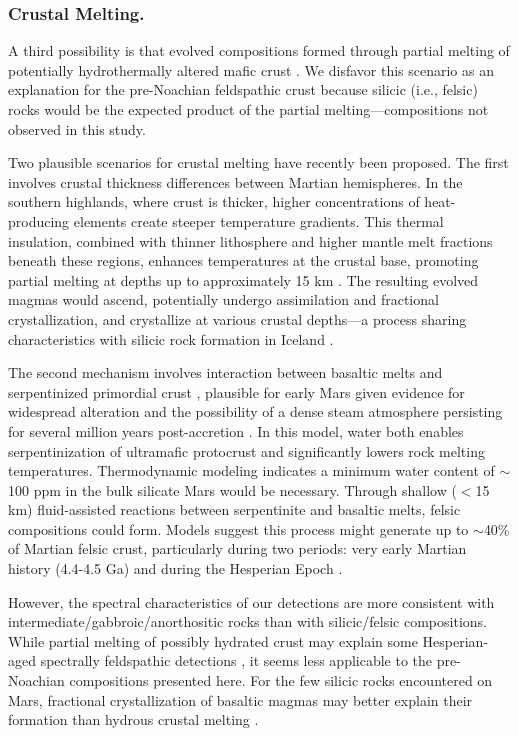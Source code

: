 \documentclass[11pt]{article}
\begin{document}
\subsubsection*{Crustal Melting.} 

A third possibility is that evolved compositions formed through partial melting of potentially hydrothermally altered mafic crust \citep{BonnetGibet2025, Bernadet2025}. We disfavor this scenario as an explanation for the pre-Noachian feldspathic crust because silicic (i.e., felsic) rocks would be the expected product of the partial melting---compositions not observed in this study.

Two plausible scenarios for crustal melting have recently been proposed. The first involves crustal thickness differences between Martian hemispheres. In the southern highlands, where crust is thicker, higher concentrations of heat-producing elements create steeper temperature gradients. This thermal insulation, combined with thinner lithosphere and higher mantle melt fractions beneath these regions, enhances temperatures at the crustal base, promoting partial melting at depths up to approximately 15 km \citep{BonnetGibet2022, BonnetGibet2025}. The resulting evolved magmas would ascend, potentially undergo assimilation and fractional crystallization, and crystallize at various crustal depths---a process sharing characteristics with silicic rock formation in Iceland \citep{Jonasson2007, Martin2007, Martin2010}.

The second mechanism involves interaction between basaltic melts and serpentinized primordial crust \citep{Bernadet2025}, plausible for early Mars given evidence for widespread alteration \citep{Bibring2006, Bishop2008, Ehlmann2009, Ehlmann2014, Wordsworth2017, Viviano2023, Carter2023, Royer2024} and the possibility of a dense steam atmosphere persisting for several million years post-accretion \citep{Abe2011, Scherf2020}. In this model, water both enables serpentinization of ultramafic protocrust and significantly lowers rock melting temperatures. Thermodynamic modeling indicates a minimum water content of $\sim$100 ppm in the bulk silicate Mars would be necessary. Through shallow ($<$15 km) fluid-assisted reactions between serpentinite and basaltic melts, felsic compositions could form. Models suggest this process might generate up to $\sim$40\% of Martian felsic crust, particularly during two periods: very early Martian history (4.4-4.5 Ga) and during the Hesperian Epoch \citep{Bernadet2025}.

However, the spectral characteristics of our detections are more consistent with intermediate/gabbroic/anorthositic rocks than with silicic/felsic compositions. While partial melting of possibly hydrated crust may explain some Hesperian-aged spectrally feldspathic detections \citep{Farrand2021, Rogers2022, Michalski2023}, it seems less applicable to the pre-Noachian compositions presented here. For the few silicic rocks encountered on Mars, fractional crystallization of basaltic magmas may better explain their formation than hydrous crustal melting \citep{Udry2018}.
\end{document}
